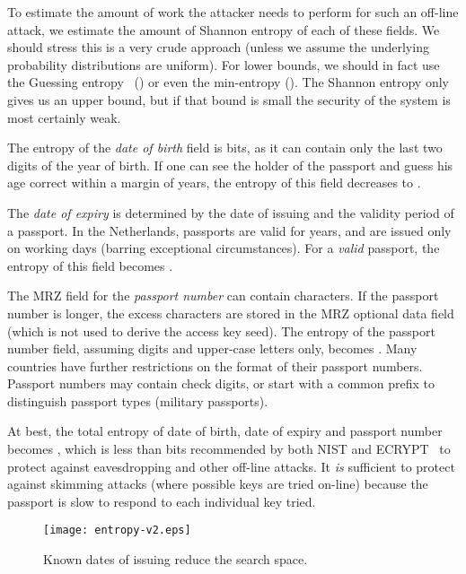 \documentclass[runningheads,envcountsame,envcountsect,oribibl]{llncs}
\begin{document}
To estimate the amount of work the attacker needs to perform for
such an off-line attack, we estimate
the amount of Shannon entropy of each of these fields. We should stress this is
a very crude approach (unless we assume the underlying probability
distributions are uniform). For lower bounds, we should in fact use the
Guessing entropy~\cite{massey1994guessingentropy} () or even the
min-entropy (). The Shannon
entropy only gives us an upper bound, but if that bound is small
the security of the system is most certainly weak.

 
The entropy of the
\emph{date of birth} field is  bits,
as it can contain only the last two digits of the year of birth.
If one can see the holder of the passport and guess his age correct within a
margin of  years, the entropy of this field decreases to .

The \emph{date of expiry} is determined by the date of issuing and the validity
period of a passport. In the Netherlands, passports are valid for  years,
and are issued only on working days (barring exceptional circumstances).
For a \emph{valid} passport, the entropy of this field becomes
.

The MRZ field for the \emph{passport number} can contain  characters. If the
passport number is longer, the excess characters are stored in the MRZ optional
data field (which is not used to derive the access key seed).
The entropy of the passport number
field, assuming digits and upper-case letters only, becomes
.  Many countries have further restrictions on the
format of their passport numbers. Passport numbers may contain check digits, or
start with a common prefix to distinguish passport types (\eg military
passports).

At best, the total entropy of date of birth, date of expiry and passport number
becomes , which is less than  bits
recommended by both NIST and ECRYPT~\cite{ecrypt-keylength,nist-keys}
to protect against eavesdropping and other off-line attacks.
It \emph{is} sufficient to protect against
skimming attacks (where possible keys are tried on-line) because the passport 
is slow to respond to each individual key tried.

\begin{figure}[t]
\begin{center}
\texttt{[image: entropy-v2.eps]}
\end{center}
\caption{Known dates of issuing reduce the search space.}
\label{fig-entropy}
\end{figure}
\end{document}
